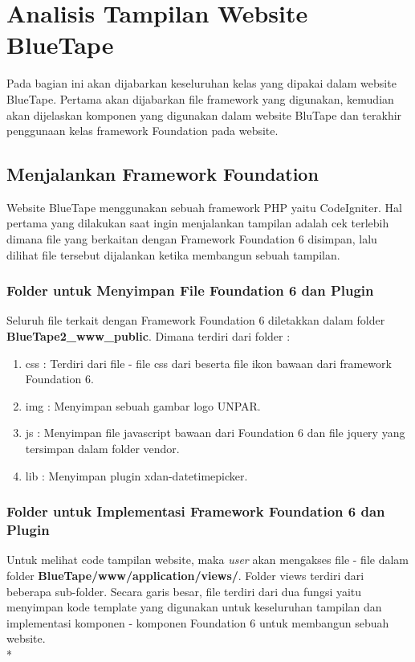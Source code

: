 \chapter{Analisis Tampilan Website BlueTape}
Pada bagian ini akan dijabarkan keseluruhan kelas yang dipakai dalam website BlueTape. Pertama akan dijabarkan file framework yang digunakan, kemudian akan dijelaskan komponen yang digunakan dalam website BluTape dan terakhir penggunaan kelas framework Foundation pada website.

\section{Menjalankan Framework Foundation}
Website BlueTape menggunakan sebuah framework PHP yaitu CodeIgniter. Hal pertama yang dilakukan saat ingin menjalankan tampilan adalah cek terlebih dimana file yang berkaitan dengan Framework Foundation 6 disimpan, lalu dilihat file tersebut dijalankan ketika membangun sebuah tampilan. 
\subsection{Folder untuk Menyimpan File Foundation 6 dan Plugin}
Seluruh file terkait dengan Framework Foundation 6 diletakkan dalam folder \textbf{BlueTape2\_www\_public}. Dimana terdiri dari folder :
\begin{enumerate}
	\item css : Terdiri dari file - file css dari beserta file ikon bawaan dari framework Foundation 6. 
	\item img : Menyimpan sebuah gambar logo UNPAR. 
	\item js  : Menyimpan file javascript bawaan dari Foundation 6 dan file jquery yang tersimpan dalam folder vendor.
	\item lib : Menyimpan plugin xdan-datetimepicker.
\end{enumerate}


\subsection{Folder untuk Implementasi Framework Foundation 6 dan Plugin}
Untuk melihat code tampilan website, maka \textit{user} akan mengakses file - file dalam folder \textbf{BlueTape/www/application/views/}. Folder views terdiri dari beberapa sub-folder. Secara garis besar, file terdiri dari dua fungsi yaitu menyimpan kode template yang digunakan untuk keseluruhan tampilan dan implementasi komponen - komponen Foundation 6 untuk membangun sebuah website. \\*

